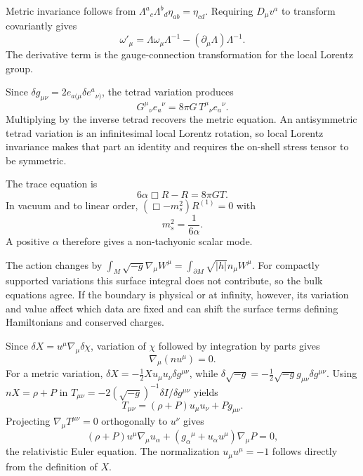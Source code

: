 \begin{solutions}
\begin{solution}
Metric invariance follows from
\(\Lambda^a{}_c\Lambda^b{}_d\eta_{ab}=\eta_{cd}\).  Requiring
\(D_\mu v^a\) to transform covariantly gives
\[
\omega'_\mu
=\Lambda\omega_\mu\Lambda^{-1}
-(\partial_\mu\Lambda)\Lambda^{-1}.
\]
The derivative term is the gauge-connection transformation for the local
Lorentz group.
\end{solution}

\begin{solution}
Since
\(\delta g_{\mu\nu}=2e_{a(\mu}\delta e^a{}_{\nu)}\), the tetrad variation
produces
\[
G^\mu{}_\nu e_a{}^\nu=8\pi G\,T^\mu{}_\nu e_a{}^\nu.
\]
Multiplying by the inverse tetrad recovers the metric equation.  An
antisymmetric tetrad variation is an infinitesimal local Lorentz rotation, so
local Lorentz invariance makes that part an identity and requires the
on-shell stress tensor to be symmetric.
\end{solution}

\begin{solution}
The trace equation is
\[
6\alpha\Box R-R=8\pi GT.
\]
In vacuum and to linear order,
\((\Box-m_s^2)R^{(1)}=0\) with
\[
m_s^2=\frac1{6\alpha}.
\]
A positive \(\alpha\) therefore gives a non-tachyonic scalar mode.
\end{solution}

\begin{solution}
The action changes by
\(\int_M\sqrt{-g}\nabla_\mu W^\mu
=\int_{\partial M}\sqrt{|h|}n_\mu W^\mu\).
For compactly supported variations this surface integral does not
contribute, so the bulk equations agree.  If the boundary is physical or at
infinity, however, its variation and value affect which data are fixed and
can shift the surface terms defining Hamiltonians and conserved charges.
\end{solution}

\begin{solution}
Since
\(\delta X=u^\mu\nabla_\mu\delta\chi\), variation of \(\chi\) followed by
integration by parts gives
\[
\nabla_\mu(nu^\mu)=0.
\]
For a metric variation,
\(\delta X=-\tfrac12X u_\mu u_\nu\delta g^{\mu\nu}\), while
\(\delta\sqrt{-g}=-\tfrac12\sqrt{-g}g_{\mu\nu}\delta g^{\mu\nu}\).
Using \(nX=\rho+P\) in
\(T_{\mu\nu}=-2(\sqrt{-g})^{-1}\delta I/\delta g^{\mu\nu}\) yields
\[
T_{\mu\nu}=(\rho+P)u_\mu u_\nu+Pg_{\mu\nu}.
\]
Projecting \(\nabla_\mu T^{\mu\nu}=0\) orthogonally to \(u^\nu\) gives
\[
(\rho+P)u^\mu\nabla_\mu u_\alpha
+(g_{\alpha}{}^\mu+u_\alpha u^\mu)\nabla_\mu P=0,
\]
the relativistic Euler equation.  The normalization \(u_\mu u^\mu=-1\)
follows directly from the definition of \(X\).
\end{solution}



\end{solutions}
